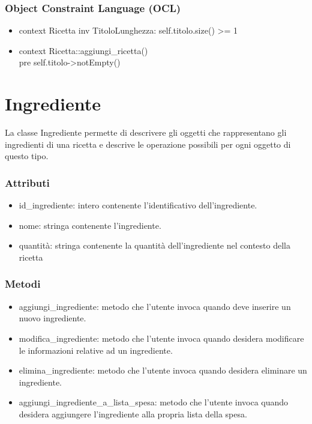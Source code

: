 \documentclass[a4paper,12pt]{article}
\begin{document}
\subsubsection*{Object Constraint Language (OCL)}
\begin{itemize}
\item {\ttfamily context Ricetta inv TitoloLunghezza: self.titolo.size() >= 1}
\item {\ttfamily context Ricetta::aggiungi\_ricetta() \\pre self.titolo->notEmpty()}

\end{itemize}
\section{Ingrediente}

La classe {\sffamily Ingrediente} permette di descrivere gli oggetti che rappresentano gli ingredienti di una ricetta e descrive le operazione possibili per ogni oggetto di questo tipo.
\subsubsection*{Attributi}
\begin{itemize} \setlength\itemsep{0.01em}
\item {\ttfamily id\_ingrediente}: intero contenente l'identificativo dell'ingrediente.
\item {\ttfamily nome}: stringa contenente l'ingrediente.
\item {\ttfamily quantità}: stringa contenente la quantità dell'ingrediente nel contesto della ricetta
\end{itemize}
\subsubsection*{Metodi}
\begin{itemize} \setlength\itemsep{0.01em}
\item {\ttfamily aggiungi\_ingrediente}: metodo che l'utente invoca quando deve inserire un nuovo ingrediente. 
\item {\ttfamily modifica\_ingrediente}: metodo che l'utente invoca quando desidera modificare le informazioni relative ad un ingrediente.
\item {\ttfamily elimina\_ingrediente}: metodo che l'utente invoca quando desidera eliminare un ingrediente. 
\item {\ttfamily aggiungi\_ingrediente\_a\_lista\_spesa}: metodo che l'utente invoca quando desidera aggiungere l'ingrediente alla propria lista della spesa. 
\end{itemize}
\end{document}
